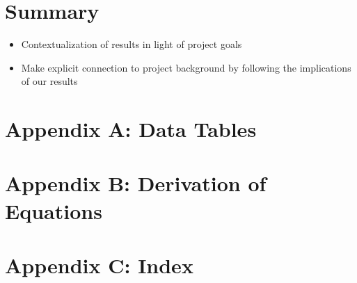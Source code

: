 \documentclass[conference]{IEEEtran}
\begin{document}
\section{Summary}
\begin{itemize}
  \item Contextualization of results in light of project goals
  \item Make explicit connection to project background by following the implications of our results
\end{itemize}




\begin{thebibliography}{00}
\end{thebibliography}
\vspace{12pt}



\section*{Appendix A: Data Tables}


\section*{Appendix B: Derivation of Equations}


\section*{Appendix C: Index}
\end{document}
